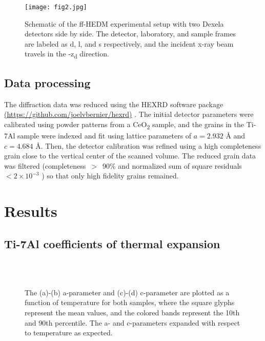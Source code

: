 \documentclass[3p]{elsarticle}
\begin{document}
		\begin{figure}[h!]
			\centering
			\texttt{[image: fig2.jpg]}
			\caption{Schematic of the f{}f-HEDM experimental setup with two Dexela detectors side by side. The detector, laboratory, and sample frames are labeled as d, l, and s respectively, and the incident x-ray beam travels in the -z\textsubscript{d} direction.} 
			\label{fig:HEDM_setup}	
		\end{figure}
		
	
	\subsection{Data processing}
		The dif{}fraction data was reduced using the HEXRD software package \url{(https://github.com/joelvbernier/hexrd)} \cite{Bernier2011}. The initial detector parameters were calibrated using powder patterns from a CeO\textsubscript{2} sample, and the grains in the Ti-7Al sample were indexed and fit using lattice parameters of $a=2.932$ {\AA} and $c=4.684$ {\AA}. Then, the detector calibration was refined using a high completeness grain close to the vertical center of the scanned volume. The reduced grain data was filtered (completeness~$>$~90\% and normalized sum of square residuals~$< 2\times10^{-3}$ \cite{Tari2018}) so that only high fidelity grains remained.  
		


\section{Results} \label{sec:results}
\subsection{Ti-7Al coef{}ficients of thermal expansion}
	\begin{figure}[b!]
		\centering
		\hspace{5pt}
		 \\
		\hspace{5pt}
		 \\
		
		\caption{The (a)-(b) a-parameter and (c)-(d) c-parameter are plotted as a function of temperature for both samples, where the square glyphs represent the mean values, and the colored bands represent the 10th and 90th percentile. The a- and c-parameters expanded with respect to temperature as expected.}
		\label{fig:lat_parm_all}
	\end{figure}
\end{document}
